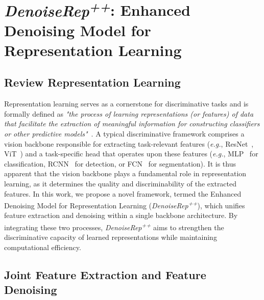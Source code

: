 \documentclass[conference]{IEEEtran}
\begin{document}
\section{\textit{DenoiseRep\textsuperscript{++}}: Enhanced Denoising Model for Representation Learning}
{\color{black}
\subsection{Review Representation Learning}

Representation learning serves as a cornerstone for discriminative tasks and is formally defined as \textit{"the process of learning representations (or features) of data that facilitate the extraction of meaningful information for constructing classifiers or other predictive models"}~\cite{6472238}.
A typical discriminative framework comprises a vision backbone responsible for extracting task-relevant features (\textit{e.g.}, ResNet~\cite{he2016deep}, ViT~\cite{dosovitskiy2020image}) and a task-specific head that operates upon these features (\textit{e.g.}, MLP~\cite{krizhevsky2012imagenet} for classification, RCNN~\cite{ren2015faster} for detection, or FCN~\cite{long2015fully} for segmentation).
It is thus apparent that the vision backbone plays a fundamental role in representation learning, as it determines the quality and discriminability of the extracted features.
%
In this work, we propose a novel framework, termed the Enhanced Denoising Model for Representation Learning (\textit{DenoiseRep\textsuperscript{++}}), which unifies feature extraction and denoising within a single backbone architecture.
By integrating these two processes, \textit{DenoiseRep\textsuperscript{++}} aims to strengthen the discriminative capacity of learned representations while maintaining computational efficiency.



\subsection{Joint Feature Extraction and Feature Denoising}


}
\end{document}
